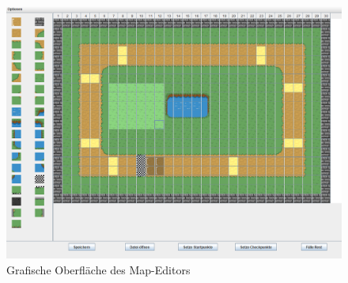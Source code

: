 \begin{figure} [h]
\centering
\includegraphics[scale=0.45]{pics/map-editor-layout.png}
\caption{Grafische Oberfläche des Map-Editors}
\label{fig:layout-mapeditor}
\end{figure}

